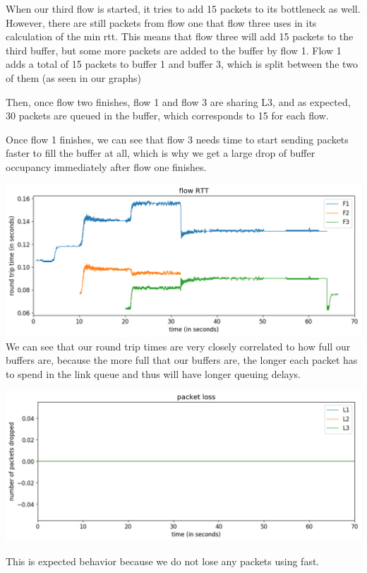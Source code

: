 \documentclass{article}
\begin{document}
When our third flow is started, it tries to add 15 packets to its bottleneck as well. However, there are still packets from flow one that flow three uses in its calculation of the min rtt. This means that flow three will add 15 packets to the third buffer, but some more packets are added to the buffer by flow 1. Flow 1 adds a total of 15 packets to buffer 1 and buffer 3, which is split between the two of them (as seen in our graphs)

Then, once flow two finishes, flow 1 and flow 3 are sharing L3, and as expected, 30 packets are queued in the buffer, which corresponds to 15 for each flow.

Once flow 1 finishes, we can see that flow 3 needs time to start sending packets faster to fill the buffer at all, which is why we get a large drop of buffer occupancy immediately after flow one finishes.

\includegraphics[width = \textwidth]{"test_case2_fast flow RTT"}
We can see that our round trip times are very closely correlated to how full our buffers are, because the more full that our buffers are, the longer each packet has to spend in the link queue and thus will have longer queuing delays.

\includegraphics[width = \textwidth]{"test_case2_fast packet loss"}

This is expected behavior because we do not lose any packets using fast.
\end{document}

